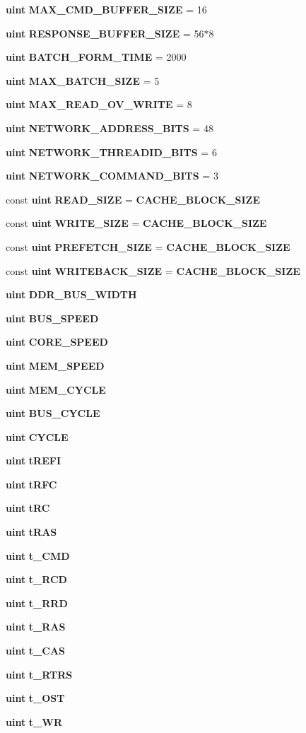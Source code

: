 \begin{CompactItemize}
{\bf uint} {\bf MAX\_\-CMD\_\-BUFFER\_\-SIZE} = 16
\item 
{\bf uint} {\bf RESPONSE\_\-BUFFER\_\-SIZE} = 56$\ast$8
\item 
{\bf uint} {\bf BATCH\_\-FORM\_\-TIME} = 2000
\item 
{\bf uint} {\bf MAX\_\-BATCH\_\-SIZE} = 5
\item 
{\bf uint} {\bf MAX\_\-READ\_\-OV\_\-WRITE} = 8
\item 
{\bf uint} {\bf NETWORK\_\-ADDRESS\_\-BITS} = 48
\item 
{\bf uint} {\bf NETWORK\_\-THREADID\_\-BITS} = 6
\item 
{\bf uint} {\bf NETWORK\_\-COMMAND\_\-BITS} = 3
\item 
const {\bf uint} {\bf READ\_\-SIZE} = {\bf CACHE\_\-BLOCK\_\-SIZE}
\item 
const {\bf uint} {\bf WRITE\_\-SIZE} = {\bf CACHE\_\-BLOCK\_\-SIZE}
\item 
const {\bf uint} {\bf PREFETCH\_\-SIZE} = {\bf CACHE\_\-BLOCK\_\-SIZE}
\item 
const {\bf uint} {\bf WRITEBACK\_\-SIZE} = {\bf CACHE\_\-BLOCK\_\-SIZE}
\item 
{\bf uint} {\bf DDR\_\-BUS\_\-WIDTH}
\item 
{\bf uint} {\bf BUS\_\-SPEED}
\item 
{\bf uint} {\bf CORE\_\-SPEED}
\item 
{\bf uint} {\bf MEM\_\-SPEED}
\item 
{\bf uint} {\bf MEM\_\-CYCLE}
\item 
{\bf uint} {\bf BUS\_\-CYCLE}
\item 
{\bf uint} {\bf CYCLE}
\item 
{\bf uint} {\bf tREFI}
\item 
{\bf uint} {\bf tRFC}
\item 
{\bf uint} {\bf tRC}
\item 
{\bf uint} {\bf tRAS}
\item 
{\bf uint} {\bf t\_\-CMD}
\item 
{\bf uint} {\bf t\_\-RCD}
\item 
{\bf uint} {\bf t\_\-RRD}
\item 
{\bf uint} {\bf t\_\-RAS}
\item 
{\bf uint} {\bf t\_\-CAS}
\item 
{\bf uint} {\bf t\_\-RTRS}
\item 
{\bf uint} {\bf t\_\-OST}
\item 
{\bf uint} {\bf t\_\-WR}
\item 

\end{CompactItemize}
